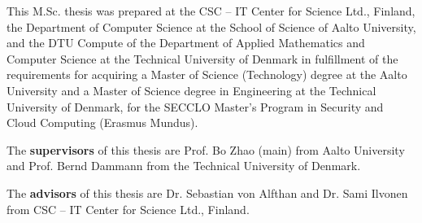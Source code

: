 This M.Sc. thesis was prepared at the CSC – IT Center for Science Ltd., Finland, the Department of Computer Science at the School of Science of Aalto University, and the DTU Compute of the Department of Applied Mathematics and Computer Science at the Technical University of Denmark in fulfillment of the requirements for acquiring a Master of Science (Technology) degree at the Aalto University and a Master of Science degree in Engineering at the Technical University of Denmark, for the SECCLO Master's Program in Security and Cloud Computing (Erasmus Mundus).

The \textbf{supervisors} of this thesis are Prof. Bo Zhao (main) from Aalto University and Prof. Bernd Dammann from the Technical University of Denmark.

The \textbf{advisors} of this thesis are Dr. Sebastian von Alfthan and Dr. Sami Ilvonen from CSC – IT Center for Science Ltd., Finland.
